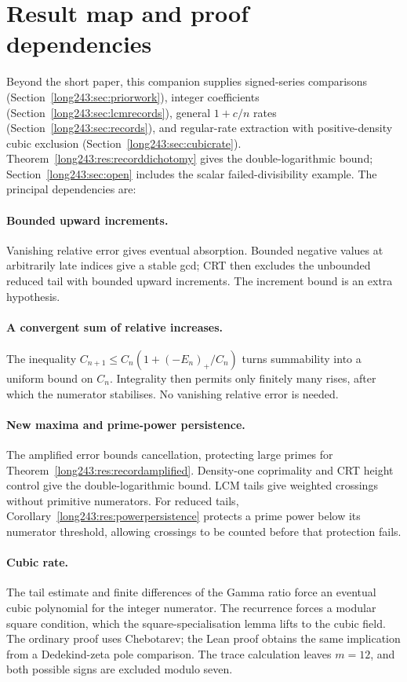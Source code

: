 \documentclass[11pt]{article}
\begin{document}
\section{Result map and proof dependencies}\label{sec:erdos-243-complete-family-map}
Beyond the short paper, this companion supplies signed-series
comparisons (Section~\ref{long243:sec:priorwork}), integer coefficients
(Section~\ref{long243:sec:lcmrecords}), general $1+c/n$ rates
(Section~\ref{long243:sec:records}), and regular-rate extraction with
positive-density cubic exclusion (Section~\ref{long243:sec:cubicrate}).
Theorem~\ref{long243:res:recorddichotomy} gives the double-logarithmic
bound; Section~\ref{long243:sec:open} includes the scalar
failed-divisibility example. The principal dependencies are:

\paragraph{Bounded upward increments.}
Vanishing relative error gives eventual absorption. Bounded negative
values at arbitrarily late indices give a stable gcd; CRT then excludes
the unbounded reduced tail with bounded upward increments. The increment
bound is an extra hypothesis.

\paragraph{A convergent sum of relative increases.}
The inequality $C_{n+1}\le C_n(1+(-E_n)_+/C_n)$ turns summability into a
uniform bound on $C_n$. Integrality then permits only finitely many rises,
after which the numerator stabilises.
No vanishing relative error is needed.

\paragraph{New maxima and prime-power persistence.}
The amplified error bounds cancellation, protecting large primes
for Theorem~\ref{long243:res:recordamplified}. Density-one coprimality
and CRT height control give the double-logarithmic bound. LCM tails
give weighted crossings without primitive numerators. For reduced
tails, Corollary~\ref{long243:res:powerpersistence} protects a prime
power below its numerator threshold, allowing crossings to be counted
before that protection fails.

\paragraph{Cubic rate.}
The tail estimate and finite differences of the Gamma ratio force an
eventual cubic polynomial for the integer numerator. The recurrence forces a modular square condition, which the square-specialisation
lemma lifts to the cubic field. The ordinary proof uses Chebotarev; the Lean
proof obtains the same implication from a Dedekind-zeta pole comparison.
The trace calculation leaves $m=12$, and both possible signs are excluded
modulo seven.
\end{document}
